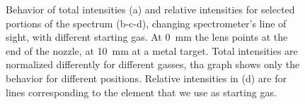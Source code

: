 \begin{figure}
\centering
  
  \hfill
  
\caption{Behavior of total intensities (a) and relative intensities for selected portions of the spectrum (b-c-d), changing spectrometer's line of sight, with different starting gas. At \SI{0}{\milli\meter} the lens points at the end of the nozzle, at \SI{10}{\milli\meter} at a metal target. Total intensities are normalized differently for different gasses, tha graph shows only the behavior for different positions. Relative intensities in (d) are for lines corresponding to the element that we use as starting gas.}
 \label{fig:Irel_pos}
\end{figure}

